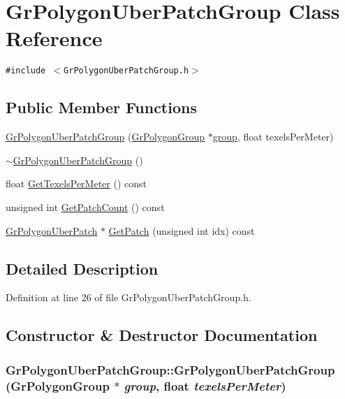 \hypertarget{class_gr_polygon_uber_patch_group}{
\section{GrPolygonUberPatchGroup Class Reference}
\label{class_gr_polygon_uber_patch_group}
}
{\tt \#include $<$GrPolygonUberPatchGroup.h$>$}

\subsection*{Public Member Functions}
\begin{CompactItemize}
\item 
\hyperlink{class_gr_polygon_uber_patch_group_0d042decb75fbd9af4b980441cc6cbe3}{GrPolygonUberPatchGroup} (\hyperlink{class_gr_polygon_group}{GrPolygonGroup} $\ast$\hyperlink{wglext_8h_69cec9b28d037f2272131b4fcd148620}{group}, float texelsPerMeter)
\item 
\hyperlink{class_gr_polygon_uber_patch_group_08541209e6759da168aaf6d007cb76c8}{$\sim$GrPolygonUberPatchGroup} ()
\item 
float \hyperlink{class_gr_polygon_uber_patch_group_9813a5a9b335e1ba7f9fe83ad1be84e4}{GetTexelsPerMeter} () const 
\item 
unsigned int \hyperlink{class_gr_polygon_uber_patch_group_3a68e3a29731c5084fcdee9c6982c706}{GetPatchCount} () const 
\item 
\hyperlink{class_gr_polygon_uber_patch}{GrPolygonUberPatch} $\ast$ \hyperlink{class_gr_polygon_uber_patch_group_f62a61e43ec4e84d4503880ae6c3dd45}{GetPatch} (unsigned int idx) const 
\end{CompactItemize}


\subsection{Detailed Description}


Definition at line 26 of file GrPolygonUberPatchGroup.h.

\subsection{Constructor \& Destructor Documentation}
\hypertarget{class_gr_polygon_uber_patch_group_0d042decb75fbd9af4b980441cc6cbe3}{
\subsubsection[{GrPolygonUberPatchGroup}]{\setlength{\rightskip}{0pt plus 5cm}GrPolygonUberPatchGroup::GrPolygonUberPatchGroup ({\bf GrPolygonGroup} $\ast$ {\em group}, \/  float {\em texelsPerMeter})}}
\label{class_gr_polygon_uber_patch_group_0d042decb75fbd9af4b980441cc6cbe3}




